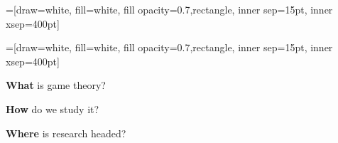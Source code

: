 {
  \begin{frame}
  \end{frame}
}

=[draw=white, fill=white, fill opacity=0.7,rectangle,
inner sep=15pt, inner xsep=400pt]

=[draw=white, fill=white, fill opacity=0.7,rectangle,
inner sep=15pt, inner xsep=400pt]


{
  \begin{frame}

    {\Large \textbf{What}} is game theory?
    \bigskip

    \pause
    {\Large \textbf{How}} do we study it?
    \bigskip

    \pause
    {\Large \textbf{Where}} is research headed?
  \end{frame}
}



